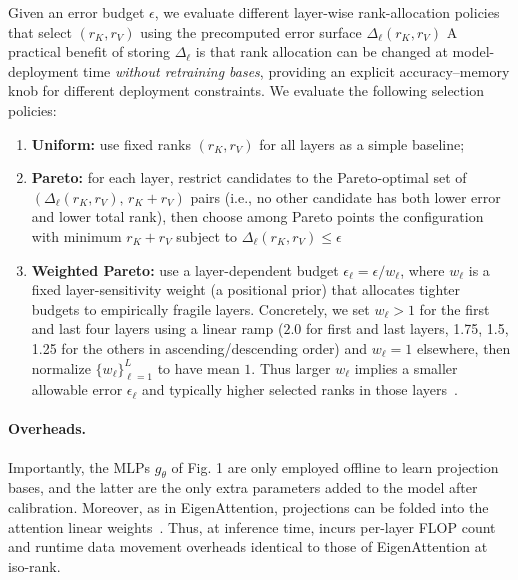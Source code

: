 Given an error budget $\epsilon$, we evaluate different layer-wise rank-allocation policies that select $(r_K,r_V)$ using the precomputed error surface $\Delta_\ell(r_K,r_V)$ %
A practical benefit of storing $\Delta_\ell$ is that rank allocation can be changed at model-deployment time \emph{without retraining bases}, providing an explicit accuracy--memory knob for different deployment constraints.
We evaluate the following selection policies:
\begin{enumerate}
    \item \textbf{Uniform:} use fixed ranks $(r_K, r_V)$ for all layers as a simple baseline;
    \item \textbf{Pareto:} for each layer, restrict candidates to the Pareto-optimal set of $(\Delta_\ell(r_K,r_V),\, r_K{+}r_V)$ pairs (i.e., no other candidate has both lower error and lower total rank), then choose among Pareto points the configuration with minimum $r_K{+}r_V$ subject to $\Delta_\ell(r_K,r_V)\le\epsilon$
    \item \textbf{Weighted Pareto:} use a layer-dependent budget $\epsilon_\ell=\epsilon/w_\ell$, where $w_\ell$ is a fixed layer-sensitivity weight (a positional prior) that allocates tighter budgets to empirically fragile layers.
    Concretely, we set $w_\ell>1$ for the first and last four layers using a linear ramp ($2.0$ for first and last layers, 1.75, 1.5, 1.25 for the others in ascending/descending order) and $w_\ell=1$ elsewhere, then normalize $\{w_\ell\}_{\ell=1}^L$ to have mean $1$.
    Thus larger $w_\ell$ implies a smaller allowable error $\epsilon_\ell$ and typically higher selected ranks in those layers~\cite{li2025kvtuner,ma2023llmpruner}.
\end{enumerate}

\paragraph{Overheads.}
Importantly, the MLPs $g_\theta$ of Fig. 1 are only employed offline to learn projection bases, and the latter are the only extra parameters added to the model after calibration. Moreover, as in EigenAttention, projections can be folded into the attention linear weights~\cite{saxena2024eigenattention}. Thus, at inference time, \methodname incurs per-layer FLOP count and runtime data movement overheads identical to those of EigenAttention at iso-rank. 


